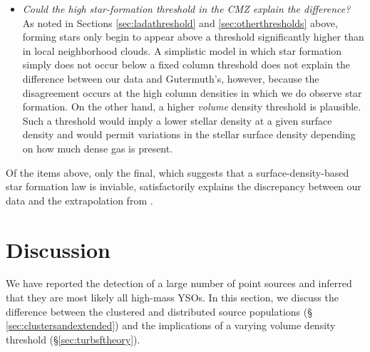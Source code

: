 \documentclass[twocolumn]{aastex61}
\begin{document}
\begin{itemize}
    \item \emph{Could the high star-formation threshold in the CMZ explain the
        difference?}
        As noted in Sections \ref{sec:ladathreshold} and
        \ref{sec:otherthresholds} above, forming stars only begin to appear
        above a threshold significantly higher than in local neighborhood
        clouds.  A simplistic model in which star formation simply does not
        occur below a fixed column threshold does not explain the difference
        between our data and Gutermuth's, however, because the disagreement
        occurs at the high column densities in which we do observe star
        formation.  On the other hand, a higher \emph{volume} density threshold
        is plausible.  Such a threshold would imply a lower stellar density at
        a given surface density and would  permit variations in the stellar
        surface density depending on how much dense gas is present.



\end{itemize}

Of the items above, only the final, which suggests that a surface-density-based
star formation law is inviable, satisfactorily explains the discrepancy between
our data and the extrapolation from \citet{Gutermuth2011a}.




\section{Discussion}
\label{sec:discussion}
We have reported the detection of a large number of point sources and inferred
that they are most likely all high-mass YSOs.  In this section,
we discuss
the difference between the clustered and distributed source populations (\S
\ref{sec:clustersandextended}) and the implications of a varying volume
density threshold (\S \ref{sec:turbsftheory}).
\end{document}
